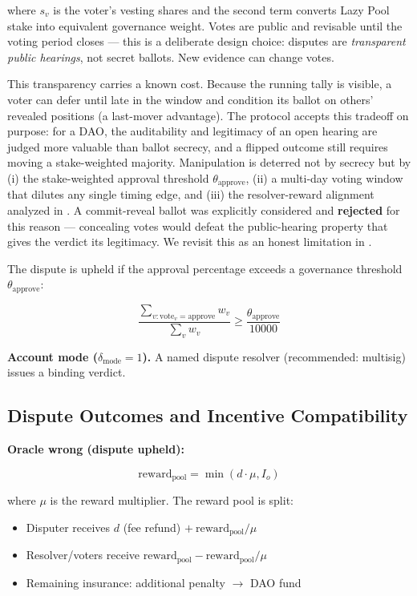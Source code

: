 \documentclass{ledger}
\theoremstyle{plain}
\theoremstyle{remark}
\begin{document}
where $s_v$ is the voter's vesting shares and the second term converts Lazy Pool
stake into equivalent governance weight. Votes are public and revisable until
the voting period closes --- this is a deliberate design choice: disputes are
\emph{transparent public hearings}, not secret ballots. New evidence can change
votes.

This transparency carries a known cost. Because the running tally is visible, a
voter can defer until late in the window and condition its ballot on others'
revealed positions (a last-mover advantage). The protocol accepts this tradeoff
on purpose: for a DAO, the auditability and legitimacy of an open hearing are
judged more valuable than ballot secrecy, and a flipped outcome still requires
moving a stake-weighted majority. Manipulation is deterred not by secrecy but by
(i) the stake-weighted approval threshold $\theta_{\text{approve}}$, (ii) a
multi-day voting window that dilutes any single timing edge, and (iii) the
resolver-reward alignment analyzed in . A commit-reveal
ballot was explicitly considered and \textbf{rejected} for this reason ---
concealing votes would defeat the public-hearing property that gives the verdict
its legitimacy. We revisit this as an honest limitation in .

The dispute is upheld if the approval percentage exceeds a governance threshold
$\theta_{\text{approve}}$:

\[
\frac{\sum_{v: \text{vote}_v = \text{approve}} w_v}{\sum_{v} w_v} \geq
\frac{\theta_{\text{approve}}}{10000}
\]

\textbf{Account mode ($\delta_{\text{mode}} = 1$).} A named dispute resolver
(recommended: multisig) issues a binding verdict.

\subsection{Dispute Outcomes and Incentive Compatibility}

\textbf{Oracle wrong (dispute upheld):}

\[
\text{reward}_{\text{pool}} = \min(d \cdot \mu, I_o)
\]

where $\mu$ is the reward multiplier. The reward pool is split:

\begin{itemize}
  \item Disputer receives $d$ (fee refund) $+\ \text{reward}_{\text{pool}} / \mu$
  \item Resolver/voters receive $\text{reward}_{\text{pool}} -
  \text{reward}_{\text{pool}} / \mu$
  \item Remaining insurance: additional penalty $\rightarrow$ DAO fund
\end{itemize}
\end{document}
